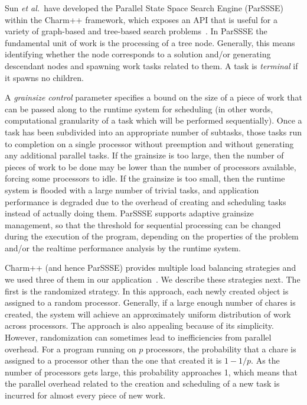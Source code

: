 \documentclass[10pt, conference, compsocconf]{IEEEtran}
\newcommand{\etal}{{\em et al.}\ }
\begin{document}
Sun \etal have developed the Parallel State Space Search Engine ({\sc ParSSSE})
within the {\sc Charm++} framework, which exposes an API that is useful for a
variety of graph-based and tree-based search problems~\cite{sun11adaptive}. In
{\sc ParSSSE} the fundamental unit of work is the processing of a tree node.
Generally, this means identifying whether the node corresponds to a solution
and/or generating descendant nodes and spawning work tasks related to them. A
task is {\em terminal} if it spawns no children. 

A {\em grainsize control} parameter specifies a bound on the size of a piece of
work that can be passed along to the runtime system for scheduling (in other words, computational granularity of a task which will be performed sequentially).  Once a
task has been subdivided into an appropriate number of subtasks, those tasks
run to completion on a single processor without preemption and without generating
any additional parallel tasks.  If the grainsize is too large, then the number
of pieces of work to be done may be lower than the number of processors
available, forcing some processors to idle.  If the grainsize is too small,
then the runtime system is flooded with a large number of trivial tasks, and
application performance is degraded due to the overhead of creating and scheduling tasks
instead of actually doing them.  {\sc ParSSSE} supports adaptive grainsize
management, so that the threshold for sequential processing can be changed
during the execution of the program, depending on the properties of the problem
and/or the realtime performance analysis by the runtime system.

{\sc Charm++} (and hence {\sc ParSSSE}) provides multiple load balancing strategies and we used three of them in our application~\cite{GengbinThesis}. We describe these strategies next. The
first is the randomized strategy.  In this approach, each newly created object
is assigned to a random processor.  Generally, if a large enough number of 
chares is created, the system will achieve an approximately uniform
distribution of work across processors.  The approach is also appealing because
of its simplicity. However, randomization can sometimes lead to inefficiencies
from parallel overhead.  For a program running on $p$ processors, the
probability that a chare is assigned to a processor other than the
one that created it is $1-1/p$.  As the number of processors gets large, this
probability approaches 1, which means that the parallel overhead related to the
creation and scheduling of a new task is incurred for almost every piece of new
work.
 
\end{document}
